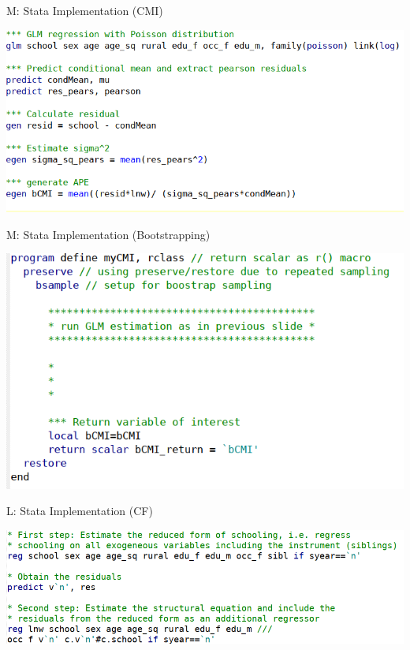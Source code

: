 \documentclass[10pt,ignorenonframetext,]{beamer}
\begin{document}
\begin{frame}{M: Stata Implementation (CMI)}
\protect\hypertarget{m-stata-implementation-cmi}{}

\includegraphics{./img/code_CMI.png}

\end{frame}

\begin{frame}{M: Stata Implementation (Bootstrapping)}
\protect\hypertarget{m-stata-implementation-bootstrapping}{}

\includegraphics{./img/code_bootstrapping.png}

\end{frame}

\begin{frame}{L: Stata Implementation (CF)}
\protect\hypertarget{l-stata-implementation-cf}{}

\includegraphics{./img/code_CF.png}

\end{frame}
\end{document}
